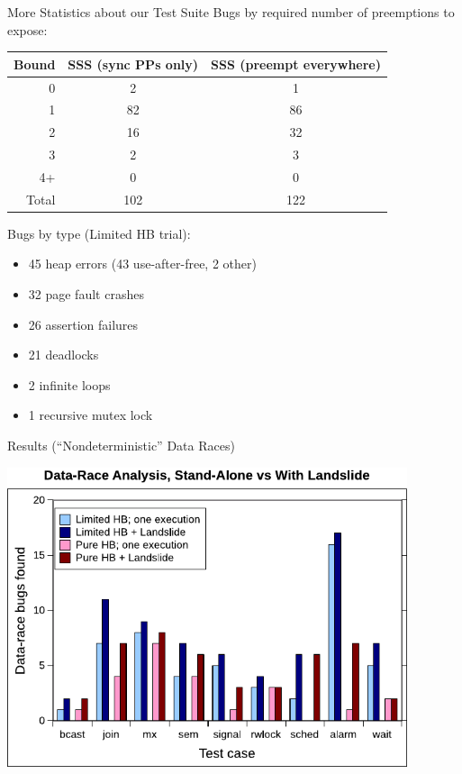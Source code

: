 \documentclass[xcolor=dvipsnames]{beamer}
\begin{document}
\begin{frame}{More Statistics about our Test Suite}
	Bugs by required number of preemptions to expose:
	\begin{center}
        	\footnotesize
        \begin{tabular}{r|c|c}
		{\bf Bound} & {\bf SSS (sync PPs only)} & {\bf SSS (preempt everywhere)} \\
                \hline
                0       & 2     & 1     \\  
                1       & 82    & 86    \\  
                2       & 16        & 32    \\  
                3       & 2     & 3     \\  
                4+      & 0     & 0     \\  
                \hline
                Total   & 102       & 122   \\  
        \end{tabular}
	\end{center}
	\linegap
	
	Bugs by type (Limited HB trial):
	\begin{itemize}
		\item 45 heap errors (43 use-after-free, 2 other)
		\item 32 page fault crashes %
		\item 26 assertion failures %
		\item 21 deadlocks
		\item 2 infinite loops
		\item 1 recursive mutex lock
	\end{itemize}
\end{frame}

\begin{frame}{Results (``Nondeterministic'' Data Races)}
	\begin{center}
		\vspace{-0.8em}
	\includegraphics[width=0.88\textwidth]{dr-false-negatives-poster.pdf}
	\end{center}
\end{frame}
\end{document}
